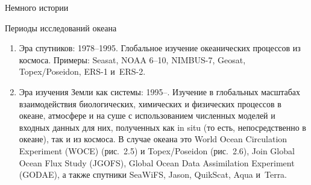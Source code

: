 \begin{chapter}{Немного истории}
\begin{section}{Периоды исследований океана}
\begin{enumerate}
\item
Эра спутников: 1978--1995. Глобальное
изучение океанических процессов из космоса. Примеры: Seasat, 
NOAA 6--10, NIMBUS-7, Geosat, Topex/Poseidon, ERS-1 и~ERS-2.
%

\item
Эра изучения Земли как системы: 1995--. Изучение в глобальных масштабах
взаимодействия биологических, химических и физических
процессов в океане, атмосфере и на суше с использованием численных моделей
и входных данных для них, полученных как in situ (то есть, непосредственно 
в океане), так и из космоса. В случае океана это
World Ocean Circulation Experiment (WOCE) (рис.~2.5) 
и Topex/Poseidon (рис.~2.6), Join Global
Ocean Flux Study (JGOFS), Global Ocean Data Assimilation Experiment (GODAE),
а также спутники SeaWiFS, Jason, QuikScat, Aqua и~Terra.
%
\end{enumerate}



\end{section}


\end{chapter}
